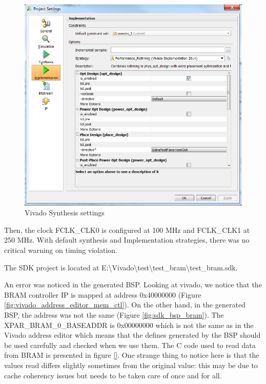 \documentclass[10pt,a4paper, oneside]{memoir}
\begin{document}
\begin{figure}
\centering
\includegraphics[scale=.4, keepaspectratio]{images/implementation_settings_vivado}
\caption{Vivado Synthesis settings}
\label{fig:vivado_implementation_settings}
\end{figure}

Then, the clock FCLK\_CLK0 is configured at 100 MHz and FCLK\_CLK1 at 250 MHz. With default synthesis and Implementation strategies, there was no critical warning on timing violation. 

The SDK project is located at E:\textbackslash Vivado\textbackslash test\textbackslash test\_bram\textbackslash test\_bram.sdk. 

An error was noticed in the generated BSP. Looking at vivado, we notice that the BRAM controller IP is mapped at address 0x40000000 (Figure \ref{fig:vivado_address_editor_mem_ctl}). On the other hand, in the generated BSP, the address was not the same (Figure \ref{fig:sdk_bsp_bram}). The XPAR\_BRAM\_0\_BASEADDR is 0x00000000 which is not the same as in the Vivado address editor which means that the defines generated by the BSP should be used carefully and checked when we use them. The C code used to read data from BRAM is presented in figure \ref{}. One strange thing to notice here is that the values read differs slightly sometimes from the original value: this may be due to cache coherency issues but needs to be taken care of once and for all.
\end{document}
